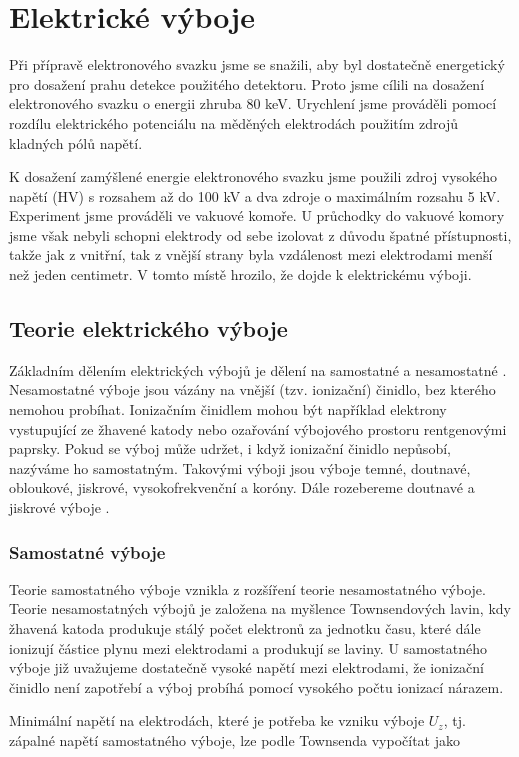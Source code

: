 \newpage
\chapter{Elektrické výboje}
\par Při přípravě elektronového svazku jsme se snažili, aby byl dostatečně energetický pro dosažení prahu detekce použitého detektoru. Proto jsme cílili na dosažení elektronového svazku o energii zhruba 80 keV. Urychlení jsme prováděli pomocí rozdílu elektrického potenciálu na měděných elektrodách použitím zdrojů kladných pólů napětí. 
\par K dosažení zamýšlené energie elektronového svazku jsme použili zdroj vysokého napětí (HV) s rozsahem až do 100 kV a dva zdroje o maximálním rozsahu 5 kV. Experiment jsme prováděli ve vakuové komoře. U průchodky do vakuové komory jsme však nebyli schopni elektrody od sebe izolovat z důvodu špatné přístupnosti, takže jak z vnitřní, tak z vnější strany byla vzdálenost mezi elektrodami menší než jeden centimetr. V tomto místě hrozilo, že dojde k elektrickému výboji.

\section{Teorie elektrického výboje}
\par Základním dělením elektrických výbojů je dělení na samostatné a nesamostatné \cite{kracik}. Nesamostatné výboje jsou vázány na vnější (tzv. ionizační) činidlo, bez kterého nemohou probíhat. Ionizačním činidlem mohou být například elektrony vystupující ze žhavené katody nebo ozařování výbojového prostoru rentgenovými paprsky. Pokud se výboj může udržet, i když ionizační činidlo nepůsobí, nazýváme ho samostatným. Takovými výboji jsou výboje temné, doutnavé, obloukové, jiskrové, vysokofrekvenční a koróny. Dále rozebereme doutnavé a jiskrové výboje \cite{kracik}.

\subsection{Samostatné výboje}
\par Teorie samostatného výboje vznikla z rozšíření teorie nesamostatného výboje. Teorie nesamostatných výbojů je založena na myšlence Townsendových lavin, kdy žhavená katoda produkuje stálý počet elektronů za jednotku času, které dále ionizují částice plynu mezi elektrodami a produkují se laviny. U samostatného výboje již uvažujeme dostatečně vysoké napětí mezi elektrodami, že ionizační činidlo není zapotřebí a výboj probíhá pomocí vysokého počtu ionizací nárazem.
\par Minimální napětí na elektrodách, které je potřeba ke vzniku výboje $U_z$, tj. zápalné napětí samostatného výboje, lze podle Townsenda vypočítat jako \cite{kracik}

